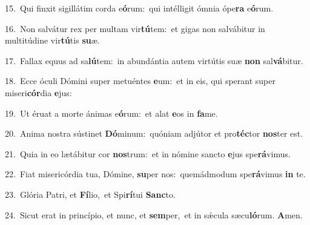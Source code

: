 {\numbfont\textcolor{\numbcolor}{15.}}~Qui finxit sigillátim corda e\-\textbf{ó}\-rum:~\star qui intélligit ómnia ópe\textbf{ra} e\-\textbf{ó}\-rum.\par
{\numbfont\textcolor{\numbcolor}{16.}}~Non salvátur rex per multam vir\-\textbf{tú}\-tem:~\star et gigas non salvábitur in multitúdine vir\-\textbf{tú}\-tis \textbf{su}\-æ.\par
{\numbfont\textcolor{\numbcolor}{17.}}~Fallax equus ad sa\-\textbf{lú}\-tem:~\star in abundántia autem virtútis suæ \textbf{non} sal\-\textbf{vá}\-bitur.\par
{\numbfont\textcolor{\numbcolor}{18.}}~Ecce óculi Dómini super metuéntes \textbf{e}\-um:~\star et in eis, qui sperant super miseri\-\textbf{cór}\-dia \textbf{e}\-jus:\par
{\numbfont\textcolor{\numbcolor}{19.}}~Ut éruat a morte ánimas e\-\textbf{ó}\-rum:~\star et alat \textbf{e}\-os in \textbf{fa}\-me.\par
{\numbfont\textcolor{\numbcolor}{20.}}~Anima nostra sústinet \textbf{Dó}\-minum:~\star quóniam adjútor et pro\-\textbf{téc}\-tor \textbf{nos}\-ter est.\par
{\numbfont\textcolor{\numbcolor}{21.}}~Quia in eo lætábitur cor \textbf{nos}\-trum:~\star et in nómine sancto \textbf{e}\-jus spe\-\textbf{rá}\-vimus.\par
{\numbfont\textcolor{\numbcolor}{22.}}~Fiat misericórdia tua, Dómine, \textbf{su}\-per nos:~\star quemádmodum spe\-\textbf{rá}\-vimus \textbf{in} te.\par
{\numbfont\textcolor{\numbcolor}{23.}}~Glória Patri, et \textbf{Fí}\-lio,~\star et Spi\-\textbf{rí}\-tui \textbf{Sanc}\-to.\par
{\numbfont\textcolor{\numbcolor}{24.}}~Sicut erat in princípio, et nunc, et \textbf{sem}\-per,~\star et in sǽcula sæcu\-\textbf{ló}\-rum. \textbf{A}\-men.\par
